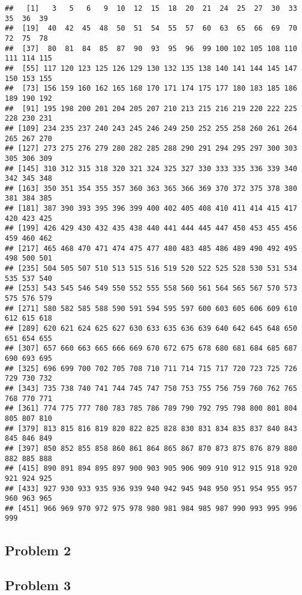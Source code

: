 \documentclass[
]{article}
\begin{document}
\begin{verbatim}
##   [1]   3   5   6   9  10  12  15  18  20  21  24  25  27  30  33  35  36  39
##  [19]  40  42  45  48  50  51  54  55  57  60  63  65  66  69  70  72  75  78
##  [37]  80  81  84  85  87  90  93  95  96  99 100 102 105 108 110 111 114 115
##  [55] 117 120 123 125 126 129 130 132 135 138 140 141 144 145 147 150 153 155
##  [73] 156 159 160 162 165 168 170 171 174 175 177 180 183 185 186 189 190 192
##  [91] 195 198 200 201 204 205 207 210 213 215 216 219 220 222 225 228 230 231
## [109] 234 235 237 240 243 245 246 249 250 252 255 258 260 261 264 265 267 270
## [127] 273 275 276 279 280 282 285 288 290 291 294 295 297 300 303 305 306 309
## [145] 310 312 315 318 320 321 324 325 327 330 333 335 336 339 340 342 345 348
## [163] 350 351 354 355 357 360 363 365 366 369 370 372 375 378 380 381 384 385
## [181] 387 390 393 395 396 399 400 402 405 408 410 411 414 415 417 420 423 425
## [199] 426 429 430 432 435 438 440 441 444 445 447 450 453 455 456 459 460 462
## [217] 465 468 470 471 474 475 477 480 483 485 486 489 490 492 495 498 500 501
## [235] 504 505 507 510 513 515 516 519 520 522 525 528 530 531 534 535 537 540
## [253] 543 545 546 549 550 552 555 558 560 561 564 565 567 570 573 575 576 579
## [271] 580 582 585 588 590 591 594 595 597 600 603 605 606 609 610 612 615 618
## [289] 620 621 624 625 627 630 633 635 636 639 640 642 645 648 650 651 654 655
## [307] 657 660 663 665 666 669 670 672 675 678 680 681 684 685 687 690 693 695
## [325] 696 699 700 702 705 708 710 711 714 715 717 720 723 725 726 729 730 732
## [343] 735 738 740 741 744 745 747 750 753 755 756 759 760 762 765 768 770 771
## [361] 774 775 777 780 783 785 786 789 790 792 795 798 800 801 804 805 807 810
## [379] 813 815 816 819 820 822 825 828 830 831 834 835 837 840 843 845 846 849
## [397] 850 852 855 858 860 861 864 865 867 870 873 875 876 879 880 882 885 888
## [415] 890 891 894 895 897 900 903 905 906 909 910 912 915 918 920 921 924 925
## [433] 927 930 933 935 936 939 940 942 945 948 950 951 954 955 957 960 963 965
## [451] 966 969 970 972 975 978 980 981 984 985 987 990 993 995 996 999
\end{verbatim}

\hypertarget{problem-2}{%
\subsection{Problem 2}\label{problem-2}}

\hypertarget{problem-3}{%
\subsection{Problem 3}\label{problem-3}}
\end{document}
